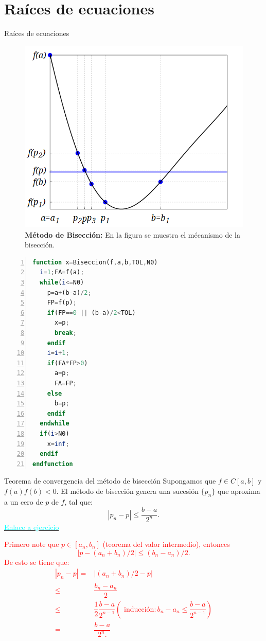 \documentclass[10pt,legalpaper]{beamer}
\begin{document}
\section{Raíces de ecuaciones}
\begin{frame}{Raíces de ecuaciones}
\begin{figure}[H]
\begin{center}
\includegraphics[scale=0.7]{Imagen20}
\end{center}
\caption{\textbf{Método de Bisección: }En la figura se muestra el mécanismo de la bisección.}
\end{figure}
\begin{lstlisting}[caption=''Método de Bisección'',style=mystyle,language=octave,numbers=left]
function x=Biseccion(f,a,b,TOL,N0)
  i=1;FA=f(a);
  while(i<=N0)
    p=a+(b-a)/2;
    FP=f(p);
    if(FP==0 || (b-a)/2<TOL)
      x=p;
      break;
    endif
    i=i+1;
    if(FA*FP>0) 
      a=p;
      FA=FP;
    else
      b=p;  
    endif
  endwhile
  if(i>N0)
    x=inf;
  endif
endfunction
\end{lstlisting}
\begin{block}{Teorema de convergencia del método de bisección}
Supongamos que $f\in C[a,b]$ y $f(a)f(b)<0$. El método de bisección genera una sucesión $\{p_n\}$ que aproxima a un cero de $p$ de $f$, tal que:
$$|p_n-p|\leq \dfrac{b-a}{2^n}.$$
\hyperlink{EjercicioBiseccion}{\textcolor{cyan}{Enlace a ejercicio}}
\end{block}
\textcolor{red}{
\indent Primero note que $p\in [a_n,b_n]$ (teorema del valor intermedio), entonces $$|p-(a_n+b_n)/2|\leq(b_n-a_n)/2.$$ De esto se tiene que:
\begin{align*}
|p_n-p|=&|(a_n+b_n)/2-p|\\
\leq & \dfrac{b_n-a_n}{2}\\
\leq & \dfrac{1}{2}\dfrac{b-a}{2^{n-1}} (\text{ inducción}: b_n-a_n\leq \dfrac{b-a}{2^{n-1}})\\
=& \dfrac{b-a}{2^n.}
\end{align*}
}
\end{frame}
\end{document}
